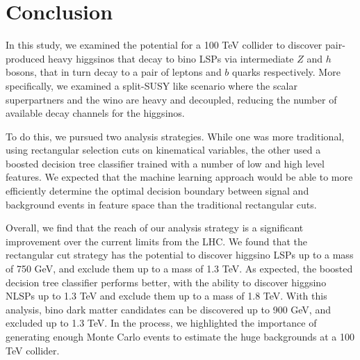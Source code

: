 \section{Conclusion}\label{sec:conclusion}

In this study, we examined the potential for a 100 TeV collider to discover pair-produced heavy higgsinos that decay to bino LSPs via intermediate $Z$ and $h$ bosons, that in turn decay to a pair of leptons and $b$ quarks respectively.  More specifically, we examined a split-SUSY like scenario where the scalar superpartners and the wino are heavy and decoupled, reducing the number of available decay channels for the higgsinos.

To do this, we pursued two analysis strategies. While one was more traditional, using rectangular selection cuts on kinematical variables, the other used a boosted decision tree classifier trained with a number of low and high level features. We expected that the machine learning approach would be able to more efficiently determine the optimal decision boundary between signal and background events in feature space than the traditional rectangular cuts.

Overall, we find that the reach of our analysis strategy is a significant improvement over the current limits from the LHC. We found that the rectangular cut strategy has the potential to discover higgsino LSPs up to a mass of 750 GeV, and exclude them up to a mass of 1.3 TeV. As expected, the boosted decision tree classifier performs better, with the ability to discover higgsino NLSPs up to 1.3 TeV and exclude them up to a mass of 1.8 TeV. With this analysis, bino dark matter candidates can be discovered up to 900 GeV, and excluded up to 1.3 TeV. In the process, we highlighted the importance of generating enough Monte Carlo events to estimate the huge backgrounds at a 100 TeV collider. 

